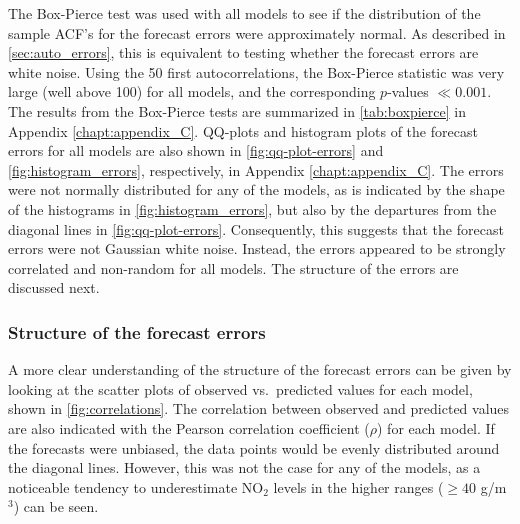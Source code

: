 The Box-Pierce test was used with all models to see if the distribution of the sample ACF's for the forecast errors were approximately normal. As described in \cref{sec:auto_errors}, this is equivalent to testing whether the forecast errors are white noise. Using the 50 first autocorrelations, the Box-Pierce statistic was very large (well above 100) for all models, and the corresponding $p$-values $\ll0.001$. The results from the Box-Pierce tests are summarized in \cref{tab:boxpierce} in Appendix \ref{chapt:appendix_C}. QQ-plots and histogram plots of the forecast errors for all models are also shown in \cref{fig:qq-plot-errors} and \cref{fig:histogram_errors}, respectively, in Appendix \ref{chapt:appendix_C}. The errors were not normally distributed for any of the models, as is indicated by the shape of the histograms in \cref{fig:histogram_errors}, but also by the departures from the diagonal lines in \cref{fig:qq-plot-errors}. Consequently, this suggests that the forecast errors were not Gaussian white noise. Instead, the errors appeared to be strongly correlated and non-random for all models. The structure of the errors are discussed next.


\subsubsection{Structure of the forecast errors}
A more clear understanding of the structure of the forecast errors can be given by looking at the scatter plots of observed vs.\ predicted values for each model, shown in \cref{fig:correlations}. The correlation between observed and predicted values are also indicated with the Pearson correlation coefficient ($\rho$) for each model. If the forecasts were unbiased, the data points would be evenly distributed around the diagonal lines. However, this was not the case for any of the models, as a noticeable tendency to underestimate NO$_2$ levels in the higher ranges ($ \geq 40$ \textmugreek g/m$^3$) can be seen.  



